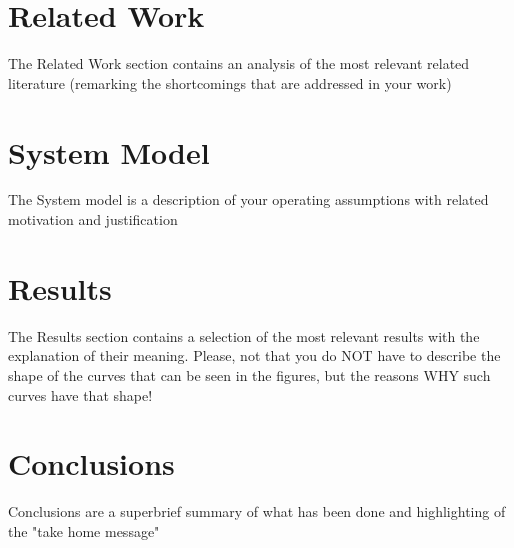 \documentclass[conference,10pt]{IEEEtran}
\begin{document}
\section{Related Work}\label{sec:sota}
The Related Work section contains an analysis of the most relevant related literature (remarking the shortcomings that are addressed in your work)

\section{System Model}\label{sec:symo}
The System model is a description of your operating assumptions with related motivation and justification

\section{Results}\label{sec:res}
The Results section contains a selection of the most relevant results with the explanation of their meaning. Please, not that you do NOT have to describe the shape of the curves that can be seen in the figures, but the reasons WHY such curves have that shape!

\section{Conclusions}\label{sec:conclusion}
Conclusions are a superbrief summary of what has been done and highlighting of the "take home message"


\newpage
\nocite{*}


\end{document}
